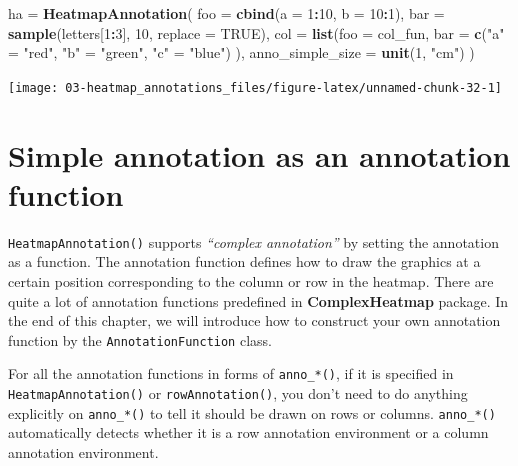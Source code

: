 \documentclass[]{book}
\newenvironment{Shaded}{\begin{snugshade}}{\end{snugshade}}
\newcommand{\KeywordTok}[1]{\textcolor[rgb]{0.13,0.29,0.53}{\textbf{#1}}}
\newcommand{\DataTypeTok}[1]{\textcolor[rgb]{0.13,0.29,0.53}{#1}}
\newcommand{\DecValTok}[1]{\textcolor[rgb]{0.00,0.00,0.81}{#1}}
\newcommand{\StringTok}[1]{\textcolor[rgb]{0.31,0.60,0.02}{#1}}
\newcommand{\OtherTok}[1]{\textcolor[rgb]{0.56,0.35,0.01}{#1}}
\newcommand{\OperatorTok}[1]{\textcolor[rgb]{0.81,0.36,0.00}{\textbf{#1}}}
\newcommand{\NormalTok}[1]{#1}
\theoremstyle{definition}
\theoremstyle{definition}
\theoremstyle{definition}
\theoremstyle{remark}
\begin{document}
\begin{Shaded}
\begin{Highlighting}[]
\NormalTok{ha =}\StringTok{ }\KeywordTok{HeatmapAnnotation}\NormalTok{(}
    \DataTypeTok{foo =} \KeywordTok{cbind}\NormalTok{(}\DataTypeTok{a =} \DecValTok{1}\OperatorTok{:}\DecValTok{10}\NormalTok{, }\DataTypeTok{b =} \DecValTok{10}\OperatorTok{:}\DecValTok{1}\NormalTok{), }
    \DataTypeTok{bar =} \KeywordTok{sample}\NormalTok{(letters[}\DecValTok{1}\OperatorTok{:}\DecValTok{3}\NormalTok{], }\DecValTok{10}\NormalTok{, }\DataTypeTok{replace =} \OtherTok{TRUE}\NormalTok{),}
    \DataTypeTok{col =} \KeywordTok{list}\NormalTok{(}\DataTypeTok{foo =}\NormalTok{ col_fun,}
               \DataTypeTok{bar =} \KeywordTok{c}\NormalTok{(}\StringTok{"a"}\NormalTok{ =}\StringTok{ "red"}\NormalTok{, }\StringTok{"b"}\NormalTok{ =}\StringTok{ "green"}\NormalTok{, }\StringTok{"c"}\NormalTok{ =}\StringTok{ "blue"}\NormalTok{)}
\NormalTok{    ),}
    \DataTypeTok{anno_simple_size =} \KeywordTok{unit}\NormalTok{(}\DecValTok{1}\NormalTok{, }\StringTok{"cm"}\NormalTok{)}
\NormalTok{)}
\end{Highlighting}
\end{Shaded}

\begin{center}\texttt{[image: 03-heatmap\_annotations\_files/figure-latex/unnamed-chunk-32-1]} \end{center}

\section{Simple annotation as an annotation
function}\label{simple-annotation-as-an-annotation-function}

\texttt{HeatmapAnnotation()} supports \emph{``complex annotation''} by
setting the annotation as a function. The annotation function defines
how to draw the graphics at a certain position corresponding to the
column or row in the heatmap. There are quite a lot of annotation
functions predefined in \textbf{ComplexHeatmap} package. In the end of
this chapter, we will introduce how to construct your own annotation
function by the \texttt{AnnotationFunction} class.

For all the annotation functions in forms of \texttt{anno\_*()}, if it
is specified in \texttt{HeatmapAnnotation()} or
\texttt{rowAnnotation()}, you don't need to do anything explicitly on
\texttt{anno\_*()} to tell it should be drawn on rows or columns.
\texttt{anno\_*()} automatically detects whether it is a row annotation
environment or a column annotation environment.
\end{document}
